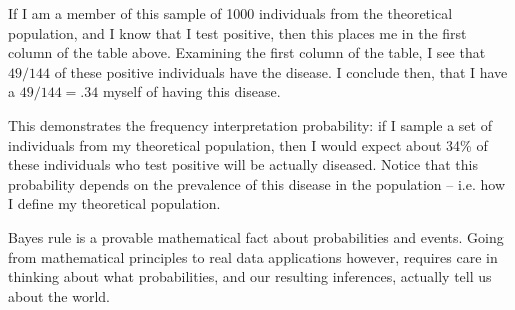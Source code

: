 \documentclass[11pt]{article}
\theoremstyle{definition}
\begin{document}
If I am a member of this sample of 1000 individuals
from the theoretical population, and I know that
I test positive, then this places me in the first
column of the table above.
Examining the first column of the table, I see
that $49 / 144$ of these positive individuals
have the disease. I conclude then,
that I have a $49 / 144 = .34$ myself
of having this disease.

This demonstrates the frequency interpretation
probability: if I sample a set of
individuals from my theoretical population,
then I would expect
about 34\% of these individuals who test
positive will be actually diseased.
Notice that this probability depends on the
prevalence of this disease in the population -- i.e.
how I define my theoretical population.

Bayes rule is a provable mathematical fact about
probabilities and events.
Going from mathematical principles to real data
applications however, requires care in
thinking about what probabilities, and our resulting
inferences, actually tell us about the world.
\end{document}
